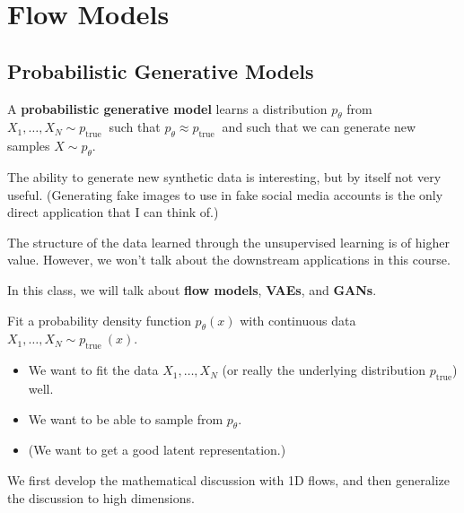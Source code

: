 \chapter{Flow Models}

\section{Probabilistic Generative Models}

\begin{definition}
    A \textbf{probabilistic generative model} learns a distribution $p_{\theta}$ from $X_{1}, \ldots, X_{N} \sim p_{\text {true }}$ such that $p_{\theta} \approx p_{\text {true }}$ and such that we can generate new samples $X \sim p_{\theta}$.

    The ability to generate new synthetic data is interesting, but by itself not very useful.
    (Generating fake images to use in fake social media accounts is the only direct application that I can think of.)

    The structure of the data learned through the unsupervised learning is of higher value. However, we won't talk about the downstream applications in this course.

    In this class, we will talk about \textbf{flow models}, \textbf{VAEs}, and \textbf{GANs}.
\end{definition}

\par\noindent\textcolor{gray}{\hdashrule{\textwidth}{0.4pt}{1pt 2pt}}

Fit a probability density function $p_{\theta}(x)$ with continuous data $X_{1}, \ldots, X_{N} \sim p_{\text {true }}(x)$.

\begin{itemize}
    \item We want to fit the data $X_{1}, \ldots, X_{N}$ (or really the underlying distribution $p_{\text {true}}$) well.
    \item We want to be able to sample from $p_{\theta}$.
    \item (We want to get a good latent representation.)
\end{itemize}

We first develop the mathematical discussion with 1D flows, and then generalize the discussion to high dimensions.

